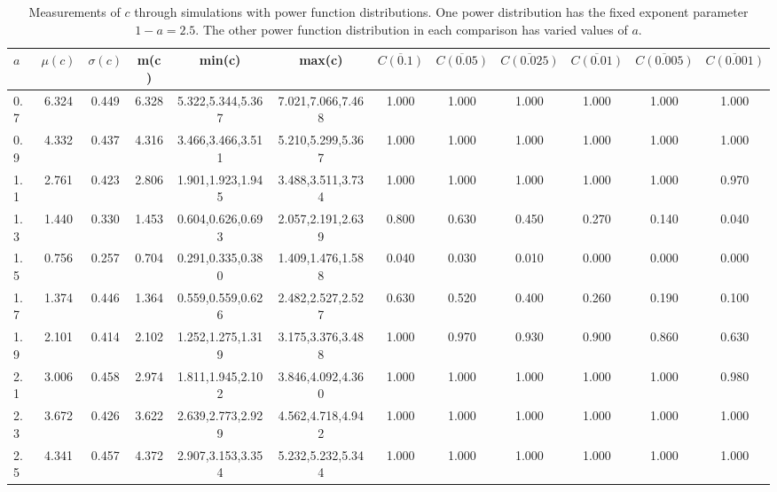 \begin{table*}[h!]
\begin{center}
\begin{tabular}{| l | c | c | c | c | c | c | c | c | c | c | c |}\hline
$a$ & $\mu(c)$ & $\sigma(c)$ & m(c) & min(c) & max(c) & $\overline{C(0.1)}$ & $\overline{C(0.05)}$ & $\overline{C(0.025)}$ & $\overline{C(0.01)}$ & $\overline{C(0.005)}$ & $\overline{C(0.001)}$ \\\hline
0.7 & 6.324 & 0.449 & 6.328 & 5.322,5.344,5.367 & 7.021,7.066,7.468  & 1.000  & 1.000  & 1.000  & 1.000  & 1.000  & 1.000 \\\hline
0.9 & 4.332 & 0.437 & 4.316 & 3.466,3.466,3.511 & 5.210,5.299,5.367  & 1.000  & 1.000  & 1.000  & 1.000  & 1.000  & 1.000 \\\hline
1.1 & 2.761 & 0.423 & 2.806 & 1.901,1.923,1.945 & 3.488,3.511,3.734  & 1.000  & 1.000  & 1.000  & 1.000  & 1.000  & 0.970 \\\hline
1.3 & 1.440 & 0.330 & 1.453 & 0.604,0.626,0.693 & 2.057,2.191,2.639  & 0.800  & 0.630  & 0.450  & 0.270  & 0.140  & 0.040 \\\hline
1.5 & 0.756 & 0.257 & 0.704 & 0.291,0.335,0.380 & 1.409,1.476,1.588  & 0.040  & 0.030  & 0.010  & 0.000  & 0.000  & 0.000 \\\hline
1.7 & 1.374 & 0.446 & 1.364 & 0.559,0.559,0.626 & 2.482,2.527,2.527  & 0.630  & 0.520  & 0.400  & 0.260  & 0.190  & 0.100 \\\hline
1.9 & 2.101 & 0.414 & 2.102 & 1.252,1.275,1.319 & 3.175,3.376,3.488  & 1.000  & 0.970  & 0.930  & 0.900  & 0.860  & 0.630 \\\hline
2.1 & 3.006 & 0.458 & 2.974 & 1.811,1.945,2.102 & 3.846,4.092,4.360  & 1.000  & 1.000  & 1.000  & 1.000  & 1.000  & 0.980 \\\hline
2.3 & 3.672 & 0.426 & 3.622 & 2.639,2.773,2.929 & 4.562,4.718,4.942  & 1.000  & 1.000  & 1.000  & 1.000  & 1.000  & 1.000 \\\hline
2.5 & 4.341 & 0.457 & 4.372 & 2.907,3.153,3.354 & 5.232,5.232,5.344  & 1.000  & 1.000  & 1.000  & 1.000  & 1.000  & 1.000 \\\hline
\end{tabular}
\caption{Measurements of $c$ through simulations
with power function distributions.
One power distribution has the fixed exponent parameter $1-a=2.5$.
The other power function distribution in each comparison
has varied values of $a$.}
\end{center}
\end{table*}